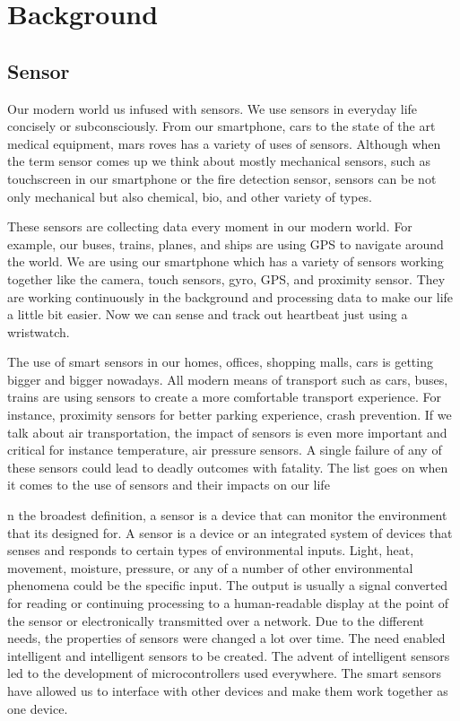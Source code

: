 
\chapter{Background}\label{chapter:background}

\section{Sensor}

Our modern world us infused with sensors. We use sensors in everyday life concisely or subconsciously. From our smartphone, cars to the state of the art medical equipment, mars roves has a variety of uses of sensors. Although when the term sensor comes up we think about mostly mechanical sensors, such as touchscreen in our smartphone or the fire detection sensor, sensors can be not only mechanical but also chemical, bio, and other variety of types.

These sensors are collecting data every moment in our modern world. For example, our buses, trains, planes, and ships are using GPS to navigate around the world. We are using our smartphone which has a variety of sensors working together like the camera, touch sensors, gyro, GPS, and proximity sensor. They are working continuously in the background and processing data to make our life a  little bit easier. Now we can sense and track out heartbeat just using a wristwatch.

The use of smart sensors in our homes, offices, shopping malls, cars is getting bigger and bigger nowadays. All modern means of transport such as cars, buses, trains are using sensors to create a more comfortable transport experience. For instance, proximity sensors for better parking experience, crash prevention. If we talk about air transportation, the impact of sensors is even more important and critical for instance temperature, air pressure sensors. A single failure of any of these sensors could lead to deadly outcomes with fatality. The list goes on when it comes to the use of sensors and their impacts on our life

n the broadest definition, a sensor is a device that can  monitor the environment that its designed for. A sensor is a device or an integrated system of devices that senses and responds to certain types of environmental inputs. Light, heat, movement, moisture, pressure, or any of a number of other environmental phenomena could be the specific input. The output is usually a signal converted for reading or continuing processing to a human-readable display at the point of the sensor or electronically transmitted over a network. Due to the different needs, the properties of sensors were changed a lot over time. The need enabled intelligent and intelligent sensors to be created. The advent of intelligent sensors led to the development of microcontrollers used everywhere. The smart sensors have allowed us to interface with other devices and make them work together as one device.


